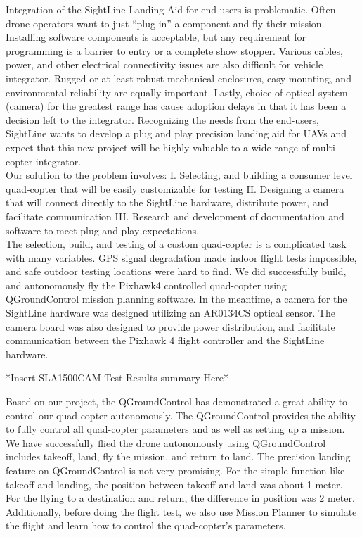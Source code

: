 \documentclass[11pt]{article}
\begin{document}
 Integration of the SightLine Landing Aid for end users is problematic.  Often drone operators want to just “plug in” a component and fly their mission.  Installing software components is acceptable, but any requirement for programming is a barrier to entry or a complete show stopper.  Various cables, power, and other electrical connectivity issues are also difficult for vehicle integrator.  Rugged or at least robust mechanical enclosures, easy mounting, and environmental reliability are equally important.  Lastly, choice of optical system (camera) for the greatest range has cause adoption delays in that it has been a decision left to the integrator. Recognizing the needs from the end-users, SightLine wants to develop a plug and play precision landing aid for UAVs and expect that this new project will be highly valuable to a wide range of multi-copter integrator.
\\
 Our solution to the problem involves: I. Selecting, and building a consumer level quad-copter that will  be easily customizable for testing II. Designing a camera that will connect directly to the SightLine hardware, distribute power, and facilitate communication III. Research and development of documentation and software to meet plug and play expectations.
\\
 The selection, build, and testing of a custom quad-copter is a complicated task with many variables. GPS signal degradation made indoor flight tests impossible, and safe outdoor testing locations were hard to find. We did successfully build, and autonomously fly the Pixhawk4 controlled quad-copter using QGroundControl mission planning software. In the meantime, a camera for the SightLine hardware was designed utilizing an AR0134CS optical sensor. The camera board was also designed to provide power distribution, and facilitate communication between the Pixhawk 4 flight controller and the SightLine hardware.

*Insert SLA1500CAM Test Results summary Here*

Based on our project, the QGroundControl has demonstrated a great ability to control our quad-copter autonomously. The QGroundControl provides the ability to fully control all quad-copter parameters and as well as setting up a mission. We have successfully flied the drone autonomously using QGroundControl includes takeoff, land, fly the mission, and return to land. The precision landing feature on QGroundControl is not very promising. For the simple function like takeoff and landing, the position between takeoff and land was about 1 meter. For the flying to a destination and return, the difference in position was 2 meter. Additionally, before doing the flight test, we also use Mission Planner to simulate the flight and learn how to control the quad-copter's parameters.
   
\end{document}
